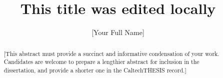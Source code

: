 \documentclass[12pt]{caltech_thesis}
\begin{document}
\title{This title was edited locally}
\author{[Your Full Name]}

\address{Pasadena, California}                     %



\maketitle[logo]

\begin{acknowledgements}
\end{acknowledgements}

\begin{abstract}
   [This abstract must provide a succinct and informative condensation of your work. Candidates are welcome to prepare a lengthier abstract for inclusion in the dissertation, and provide a shorter one in the CaltechTHESIS record.]
\end{abstract}

\begin{publishedcontent}%
\nocite{Cahn:etal:2015,Cahn:etal:2016}
\end{publishedcontent}
\end{document}
